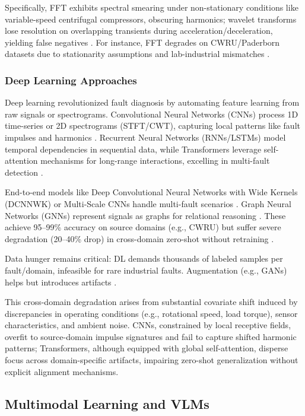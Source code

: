 Specifically, FFT exhibits spectral smearing under non-stationary conditions like variable-speed centrifugal compressors, obscuring harmonics; wavelet transforms lose resolution on overlapping transients during acceleration/deceleration, yielding false negatives \cite{casewestern,paderborn}. For instance, FFT degrades on CWRU/Paderborn datasets due to stationarity assumptions and lab-industrial mismatches \cite{casewestern,paderborn}.

\subsubsection{Deep Learning Approaches}
Deep learning revolutionized fault diagnosis by automating feature learning from raw signals or spectrograms. Convolutional Neural Networks (CNNs) process 1D time-series or 2D spectrograms (STFT/CWT), capturing local patterns like fault impulses and harmonics \cite{jia2016deep,verstraete2020cnn}. Recurrent Neural Networks (RNNs/LSTMs) model temporal dependencies in sequential data, while Transformers leverage self-attention mechanisms for long-range interactions, excelling in multi-fault detection \cite{li2022transformer}.

End-to-end models like Deep Convolutional Neural Networks with Wide Kernels (DCNNWK) or Multi-Scale CNNs handle multi-fault scenarios \cite{wen2022maml}. Graph Neural Networks (GNNs) represent signals as graphs for relational reasoning \cite{li2023gnn}. These achieve 95--99\% accuracy on source domains (e.g., CWRU) but suffer severe degradation (20--40\% drop) in cross-domain zero-shot without retraining \cite{wang2020transfer,hoang2023vit}.

Data hunger remains critical: DL demands thousands of labeled samples per fault/domain, infeasible for rare industrial faults. Augmentation (e.g., GANs) helps but introduces artifacts \cite{hoang2023vit}.

This cross-domain degradation arises from substantial covariate shift induced by discrepancies in operating conditions (e.g., rotational speed, load torque), sensor characteristics, and ambient noise. CNNs, constrained by local receptive fields, overfit to source-domain impulse signatures and fail to capture shifted harmonic patterns; Transformers, although equipped with global self-attention, disperse focus across domain-specific artifacts, impairing zero-shot generalization without explicit alignment mechanisms.

\subsection{Multimodal Learning and VLMs}

